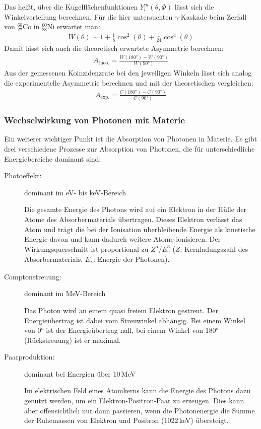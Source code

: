 Das heißt, über die Kugelflächenfunktionen $Y^m_l(\theta,\Phi)$ lässt sich die Winkelverteilung berechnen. Für die hier untersuchten $\gamma$-Kaskade beim Zerfall von $^{60}_{27}$Co in $^{60}_{28}$Ni erwartet man:
\begin{align}
	\label{eq:korrelation}
	W(\theta)\sim 1+\frac{1}{8}\cos^2(\theta)+\frac{1}{24}\cos^4(\theta)
\end{align}
Damit lässt sich auch die theoretisch erwartete Asymmetrie berechnen:
\begin{align}
	A_\text{theo.}=\frac{W(180\text{°})-W(90\text{°})}{W(90\text{°})}
\end{align}
Aus der gemessenen Koinzidenzrate bei den jeweiligen Winkeln lässt sich analog die experimentelle Asymmetrie berechnen und mit der theoretischen vergleichen:
\begin{align}
A_\text{exp.}=\frac{C(180\text{°})-C(90\text{°})}{C(90\text{°})}
\end{align}
\subsubsection{Wechselwirkung von Photonen mit Materie}

Ein weiterer wichtiger Punkt ist die Absorption von Photonen in Materie. Es gibt drei verschiedene Prozesse zur Absorption von Photonen, die für unterschiedliche Energiebereiche dominant sind:

\begin{description}
	\item[Photoeffekt:]\hfill
	dominant im eV- bis keV-Bereich
	
	Die gesamte Energie des Photons wird auf ein Elektron in der Hülle der Atome des Absorbermaterials übertragen. Dieses Elektron verlässt das Atom und trägt die bei der Ionisation überbleibende Energie als kinetische Energie davon und kann dadurch weitere Atome ionisieren. Der Wirkungsquerschnitt ist proportional zu $Z^5/E_\gamma^3$ ($Z$: Kernladungszahl des Absorbermaterials, $E_\gamma$: Energie der Photonen).
	
	\item[Comptonstreuung:]\hfill 
	dominant im MeV-Bereich
	
	Das Photon wird an einem quasi freiem Elektron gestreut. Der Energieübertrag ist dabei vom Streuwinkel abhängig. Bei einem Winkel von 0° ist der Energieübertrag null, bei einem Winkel von 180° (Rückstreuung) ist er maximal.
	
	\item[Paarproduktion:]\hfill 
	dominant bei Energien über 10\,MeV
	
	Im elektrischen Feld eines Atomkerns  kann die Energie des Photons dazu genutzt werden, um ein Elektron-Positron-Paar zu erzeugen. Dies kann aber offensichtlich nur dann passieren, wenn die Photonenergie die Summe der Ruhemassen von Elektron und Positron (1022\,keV) übersteigt.
\end{description}

